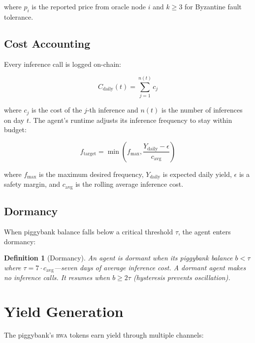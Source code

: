 \documentclass[11pt,letterpaper]{article}
\newtheorem{definition}{Definition}[section]
\newcommand{\RWA}{\textsc{rwa}}
\begin{document}
where $p_i$ is the reported price from oracle node $i$ and $k \geq 3$ for Byzantine fault tolerance.

\subsection{Cost Accounting}

Every inference call is logged on-chain:

\begin{equation}
C_{\text{daily}}(t) = \sum_{j=1}^{n(t)} c_j
\end{equation}

where $c_j$ is the cost of the $j$-th inference and $n(t)$ is the number of inferences on day $t$. The agent's runtime adjusts its inference frequency to stay within budget:

\begin{equation}
f_{\text{target}} = \min\left(f_{\text{max}}, \frac{Y_{\text{daily}} - \epsilon}{c_{\text{avg}}}\right)
\label{eq:frequency}
\end{equation}

where $f_{\text{max}}$ is the maximum desired frequency, $Y_{\text{daily}}$ is expected daily yield, $\epsilon$ is a safety margin, and $c_{\text{avg}}$ is the rolling average inference cost.

\subsection{Dormancy}

When piggybank balance falls below a critical threshold $\tau$, the agent enters dormancy:

\begin{definition}[Dormancy]
An agent is dormant when its piggybank balance $b < \tau$ where $\tau = 7 \cdot c_{\text{avg}}$---seven days of average inference cost. A dormant agent makes no inference calls. It resumes when $b \geq 2\tau$ (hysteresis prevents oscillation).
\end{definition}

\section{Yield Generation}
\label{sec:yield}

The piggybank's \RWA{} tokens earn yield through multiple channels:
\end{document}
